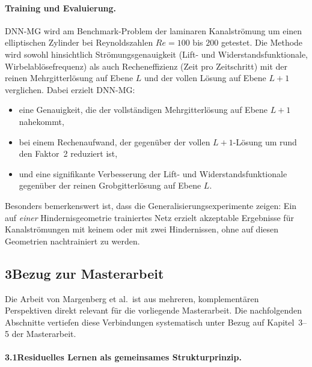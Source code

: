 \documentclass[a4paper,12pt]{article}
\begin{document}
\paragraph{Training und Evaluierung.}
DNN-MG wird am Benchmark-Problem der laminaren Kanalströmung um einen
elliptischen Zylinder bei Reynoldszahlen $Re = 100$ bis $200$ getestet.
Die Methode wird sowohl hinsichtlich Strömungsgenauigkeit (Lift- und
Widerstandsfunktionale, Wirbelablösefrequenz) als auch Recheneffizienz
(Zeit pro Zeitschritt) mit der reinen Mehrgitterlösung auf Ebene $L$ und
der vollen Lösung auf Ebene $L+1$ verglichen. Dabei erzielt DNN-MG:
\begin{itemize}
    \item eine Genauigkeit, die der vollständigen Mehrgitterlösung auf
          Ebene $L+1$ nahekommt,
    \item bei einem Rechenaufwand, der gegenüber der vollen $L+1$-Lösung
          um rund den Faktor~2 reduziert ist,
    \item und eine signifikante Verbesserung der Lift- und
          Widerstandsfunktionale gegenüber der reinen Grobgitterlösung auf Ebene $L$.
\end{itemize}
Besonders bemerkenswert ist, dass die Generalisierungsexperimente zeigen:
Ein auf \emph{einer} Hindernisgeometrie trainiertes Netz erzielt akzeptable
Ergebnisse für Kanalströmungen mit keinem oder mit zwei Hindernissen,
ohne auf diesen Geometrien nachtrainiert zu werden.

\subsection*{3\quad Bezug zur Masterarbeit}

Die Arbeit von Margenberg et al.\ ist aus mehreren, komplementären
Perspektiven direkt relevant für die vorliegende Masterarbeit.
Die nachfolgenden Abschnitte vertiefen diese Verbindungen
systematisch unter Bezug auf Kapitel~3--5 der Masterarbeit.

\paragraph{3.1\quad Residuelles Lernen als gemeinsames Strukturprinzip.}
\end{document}
